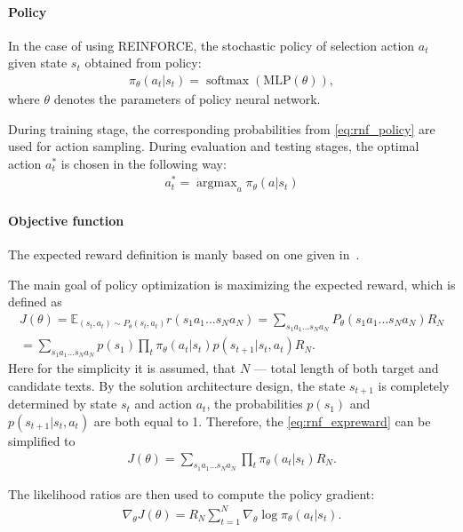 \documentclass{article}
\begin{document}
\paragraph{Policy}
In the case of using REINFORCE, the stochastic policy of selection action $a_t$
given state $s_t$ obtained from policy:
\begin{align}
  \label{eq:rnf_policy}
  \pi_{\theta}(a_t | s_t) =
  \operatorname{softmax}(\text{MLP}(\theta)),
\end{align}
where $\theta$ denotes the parameters of policy neural network.

During training stage, the corresponding probabilities from
\cref{eq:rnf_policy} are used for action sampling. During evaluation and
testing stages, the optimal action $a_t^\ast$ is chosen in the following way:
\begin{align}
  \label{eq:rnf_optimal}
  a_t^\ast = \operatorname{argmax}_{a}\pi_{\theta}(a | s_t)
\end{align}

\paragraph{Objective function}
The expected reward definition is manly based on one given in~\cite{Zhang2018}.

The main goal of policy optimization is maximizing the expected reward, which
is defined as
\begin{multline}\label{eq:rnf_expreward}
  J(\theta) = \mathbb{E}_{(s_t, a_t) \sim P_{\theta}(s_t, a_t)} r(s_1 a_1 \dots s_N
  a_N) = \sum_{s_1 a_1 \dots s_N a_N} P_{\theta}(s_1 a_1 \dots s_N a_N)R_N \\ =
  \sum_{s_1 a_1 \dots s_N a_N} p(s_1) \prod_t \pi_{\theta}(a_t | s_t)p(s_{t+1}|
  s_t, a_t)R_N.
\end{multline}
Here for the simplicity it is assumed,
that $N$ --- total length of both target and candidate texts.
By the solution architecture design, the state $s_{t+1}$ is completely
determined by state $s_t$ and action $a_t$, the probabilities
$p(s_1)$ and $p(s_{t+1}|s_t, a_t)$ are both equal to 1. Therefore,
the \cref{eq:rnf_expreward} can be simplified to
\begin{align}
  J(\theta) = \sum_{s_1 a_1 \dots s_N a_N}\prod_t \pi_{\theta}(a_t | s_t)R_N.
\end{align}

The likelihood ratios are then used to compute the policy gradient:
\begin{align}
  \label{eq:rnf_pg}
  \nabla_{\theta} J(\theta) = R_N \sum_{t=1}^N \nabla_{\theta} \log \pi_{\theta}(a_t | s_t).
\end{align}
\end{document}
